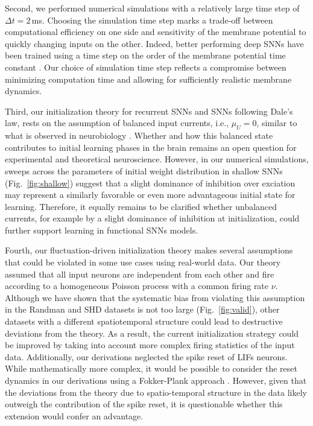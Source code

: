 \documentclass[11pt,a4paper]{article}
\begin{document}
Second, we performed numerical simulations with a relatively large time step of $\Delta t = 2$\,ms. 
Choosing the simulation time step marks a trade-off between computational efficiency on one side and sensitivity of the membrane potential to quickly changing inputs on the other. 
Indeed, better performing deep \acp{SNN} have been trained using a time step on the order of the membrane potential time constant \citep{Na2022-vb,Ding2021-ql}. 
Our choice of simulation time step reflects a compromise between minimizing computation time and allowing for sufficiently realistic membrane dynamics. 

Third, our initialization theory for recurrent \acp{SNN} and \acp{SNN} following Dale's law, rests on the assumption of balanced input currents, i.e., $\mu_U = 0$, similar to what is observed in neurobiology \citep{brunel_dynamics_2000, vogels_neural_2005}.
Whether and how this balanced state contributes to initial learning phases in the brain remains an open question for experimental and theoretical neuroscience.
However, in our numerical simulations, sweeps across the parameters of initial weight distribution in shallow \acp{SNN} (Fig.~\ref{fig:shallow}) suggest that a slight dominance of inhibition over exciation may represent a similarly favorable or even more advantageous initial state for learning.
Therefore, it equally remains to be clarified whether unbalanced currents, for example by a slight dominance of inhibition at initialization, could further support learning in functional \acp{SNN} models. 

Fourth, our fluctuation-driven initialization theory makes several assumptions that could be violated in some use cases using real-world data. 
Our theory assumed that all input neurons are independent from each other and fire according to a homogeneous Poisson process with a common firing rate $\nu$.
Although we have shown that the systematic bias from violating this assumption in the Randman and \ac{SHD} datasets is not too large (Fig.~\ref{fig:valid}), other datasets with a different spatiotemporal structure could lead to destructive deviations from the theory.
As a result, the current initialization strategy could be improved by taking into account more complex firing statistics of the input data.
Additionally, our derivations neglected the spike reset of \acp{LIF} neurons.
While mathematically more complex, it would be possible to consider the reset dynamics in our derivations using a Fokker-Plank approach \citep{Amit1997-ds}.
However, given that the deviations from the theory due to spatio-temporal structure in the data likely outweigh the contribution of the spike reset, it is questionable whether this extension would confer an advantage.
\end{document}
